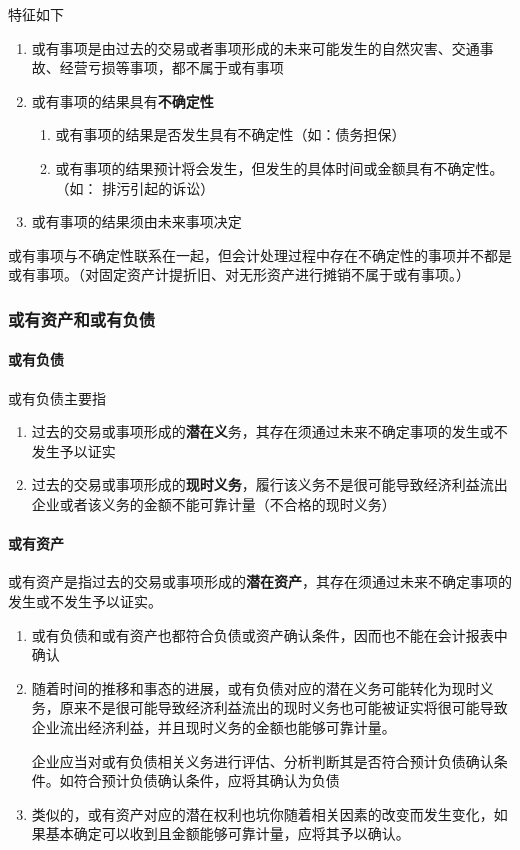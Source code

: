 \documentclass[UTF8,12pt]{ctexart}
\numberwithin{equation}{section} %
\numberwithin{figure}{section}
\numberwithin{table}{section}
\begin{document}
	特征如下
	\begin{enumerate}
		\item 或有事项是由过去的交易或者事项形成的未来可能发生的自然灾害、交通事故、经营亏损等事项，都不属于或有事项
		
		\item 或有事项的结果具有\textbf{不确定性}
		\begin{enumerate}
			\item 或有事项的结果是否发生具有不确定性（如：债务担保）
			
			\item 或有事项的结果预计将会发生，但发生的具体时间或金额具有不确定性。（如：  排污引起的诉讼）
		\end{enumerate}
		
		\item 或有事项的结果须由未来事项决定
	\end{enumerate}

	或有事项与不确定性联系在一起，但会计处理过程中存在不确定性的事项并不都是或有事项。（对固定资产计提折旧、对无形资产进行摊销不属于或有事项。）
	
	\subsubsection{或有资产和或有负债}
	\paragraph{或有负债}
	或有负债主要指
	\begin{enumerate}
		\item 过去的交易或事项形成的\textbf{潜在义}务，其存在须通过未来不确定事项的发生或不发生予以证实
		
		\item 过去的交易或事项形成的\textbf{现时义务}，履行该义务不是很可能导致经济利益流出企业或者该义务的金额不能可靠计量（不合格的现时义务）
	\end{enumerate}
	
	\paragraph{或有资产}
	或有资产是指过去的交易或事项形成的\textbf{潜在资产}，其存在须通过未来不确定事项的发生或不发生予以证实。
	
	\begin{enumerate}
		\item 或有负债和或有资产也都符合负债或资产确认条件，因而也不能在会计报表中确认
		
		\item 随着时间的推移和事态的进展，或有负债对应的潜在义务可能转化为现时义务，原来不是很可能导致经济利益流出的现时义务也可能被证实将很可能导致企业流出经济利益，并且现时义务的金额也能够可靠计量。
		
		企业应当对或有负债相关义务进行评估、分析判断其是否符合预计负债确认条件。如符合预计负债确认条件，应将其确认为负债
		
		\item 类似的，或有资产对应的潜在权利也坑你随着相关因素的改变而发生变化，如果基本确定可以收到且金额能够可靠计量，应将其予以确认。
	\end{enumerate}
	
\end{document}
